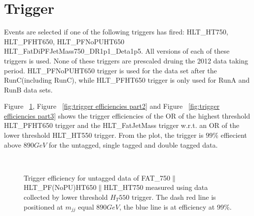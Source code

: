 \newpage

\section{Trigger}
\label{sec:trigger}


Events are selected if one of the following triggers has fired: HLT\_HT750, HLT\_PFHT650, HLT\_PFNoPUHT650
HLT\_FatDiPFJetMass750\_DR1p1\_Deta1p5.  All versions of each of these triggers is used. None of these triggers are prescaled druing the 2012 data taking period. HLT\_PFNoPUHT650 trigger is used for the data set after the RunC(including RunC), while HLT\_PFHT650
trigger is only used for RunA and RunB data sets. 


Figure ~\ref{fig:trigger efficiencies part1}, Figure ~\ref{fig:trigger efficiencies part2} and Figure ~\ref{fig:trigger efficiencies part3} shows the trigger efficiencies of the OR of the highest threshold HLT\_PFHT650 trigger and the HLT\_FatJetMass trigger w.r.t. an OR of the lower threshold HLT\_HT550 trigger. From the plot, the trigger is $99\%$ effiecient above $890 GeV$ for the untagged, single tagged and double tagged data. 


\begin{figure}[htb]
\centering
      \\   
\caption[Trigger efficiencies]{Trigger efficiency for untagged data of FAT\_750$\parallel$HLT\_PF(NoPU)HT650$\parallel$HLT\_HT750 measured using data collected by lower threshold $H_T550$ trigger. The dash red line is positioned at $m_{jj}$ equal $890 GeV$, the blue line is at efficiency at 99$\%$. }
  \label{fig:trigger efficiencies part1}
\end{figure}

